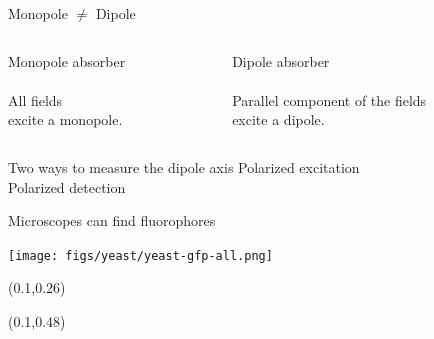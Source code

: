 \documentclass[presentation]{beamer}
\begin{document}
\begin{frame}{Monopole $\neq$ Dipole}
  \vspace{3em}
  \begin{columns}
    \begin{column}{.5\textwidth}
      \centering Monopole absorber \\ \vspace{.5em}
      \vspace{-3em}\\ All fields\\ excite a monopole. 
  \end{column}
  \begin{column}{.5\textwidth}
    \centering Dipole absorber \\ \vspace{.5em}
    \vspace{-3em}\\ Parallel component of the fields\\ excite a dipole. 
  \end{column}    
\end{columns}
\centering
\vspace{0.5em}
\end{frame}

\begin{frame}{Two ways to measure the dipole axis}
  \centering
  \Large
  Polarized excitation\\ \vspace{1em}
  Polarized detection
\end{frame}

\begin{frame}{Microscopes can find fluorophores}
  \begin{center}
    \texttt{[image: figs/yeast/yeast-gfp-all.png]}
\end{center}
\setlength{\TPHorizModule}{\textwidth}
\setlength{\TPVertModule}{\textwidth}
\begin{textblock}{0.49}(0.1,0.26)
 \end{textblock}
\begin{textblock}{0.49}(0.1,0.48)
\end{textblock}
\end{frame}
\end{document}
